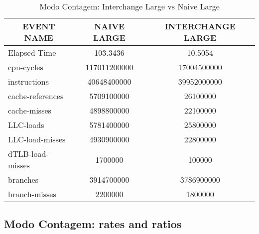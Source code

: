 \documentclass[11pt, oneside]{article}   	%
\begin{document}
\begin{table}[h!]
\centering
\label{table:modo_contagem_contadores}
\begin{tabular}{|l|c|c|}
\hline
\multicolumn{1}{|c|}{\textbf{EVENT NAME}} & \textbf{NAIVE LARGE} & \textbf{INTERCHANGE LARGE} \\ \hline
Elapsed Time                              & 103.3436             & 10.5054                    \\ \hline
cpu-cycles                                & 117011200000         & 17004500000                \\ \hline
instructions                              & 40648400000          & 39952000000                \\ \hline
cache-references                          & 5709100000           & 26100000                   \\ \hline
cache-misses                              & 4898800000           & 22100000                   \\ \hline
LLC-loads                                 & 5781400000           & 25800000                   \\ \hline
LLC-load-misses                           & 4930900000           & 22800000                   \\ \hline
dTLB-load-misses                          & 1700000              & 100000                     \\ \hline
branches                                  & 3914700000           & 3786900000                 \\ \hline
branch-misses                             & 2200000              & 1800000                    \\ \hline
\end{tabular}
\caption{Modo Contagem: Interchange Large vs Naive Large}
\end{table}

\subsection{Modo Contagem: rates and ratios}
\end{document}

